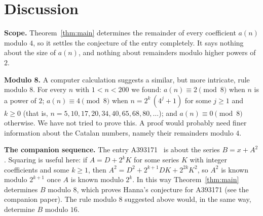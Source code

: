 \documentclass[11pt,a4paper]{article}
\theoremstyle{definition}
\theoremstyle{remark}
\newcommand{\para}[1]{\par\medskip\noindent\textbf{#1}\enspace}
\begin{document}
\section{Discussion}\label{sec:discussion}

\para{Scope.} Theorem~\ref{thm:main} determines the remainder of every coefficient $a(n)$ modulo $4$, so it settles
the conjecture of the entry completely. It says nothing about the size of $a(n)$, and nothing about remainders modulo
higher powers of $2$.

\para{Modulo 8.} A computer calculation suggests a similar, but more intricate, rule modulo $8$. For every $n$ with
$1<n<200$ we found: $a(n)\equiv2\pmod8$ when $n$ is a power of $2$; $a(n)\equiv4\pmod8$ when $n=2^k\,(4^j+1)$ for some
$j\ge1$ and $k\ge0$ (that is, $n=5,10,17,20,34,40,65,68,80,\dots$); and $a(n)\equiv0\pmod8$ otherwise. We have not tried
to prove this. A proof would probably need finer information about the Catalan numbers, namely their remainders
modulo $4$.

\para{The companion sequence.} The entry A393171~\cite{oeis171} is about the series $B=x+A^2$. Squaring is useful here:
if $A=D+2^kK$ for some series $K$ with integer coefficients and some $k\ge1$, then $A^2=D^2+2^{k+1}DK+2^{2k}K^2$, so $A^2$
is known modulo $2^{k+1}$ once $A$ is known modulo $2^k$. In this way Theorem~\ref{thm:main} determines $B$ modulo $8$,
which proves Hanna's conjecture for A393171 (see the companion paper). The rule modulo $8$ suggested above would, in the
same way, determine $B$ modulo $16$.
\end{document}
